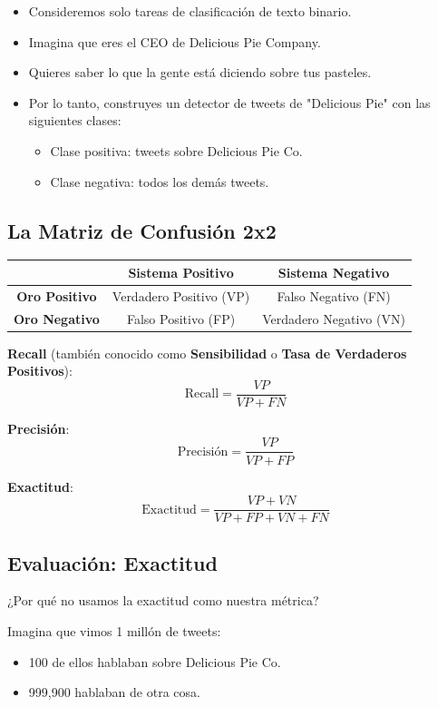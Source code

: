 \documentclass[11pt,fleqn]{book} %
\begin{document}
\begin{itemize}
 \item Consideremos solo tareas de clasificación de texto binario.
 \item Imagina que eres el CEO de Delicious Pie Company.
 \item Quieres saber lo que la gente está diciendo sobre tus pasteles.
 \item Por lo tanto, construyes un detector de tweets de "Delicious Pie" con las siguientes clases:
\begin{itemize}
\item Clase positiva: tweets sobre Delicious Pie Co.
\item Clase negativa: todos los demás tweets.
\end{itemize}
\end{itemize}



\subsection{La Matriz de Confusión 2x2}
\begin{table}[h]
\centering
\begin{tabular}{|c|c|c|}
\hline
\textbf{} & \textbf{Sistema Positivo} & \textbf{Sistema Negativo} \\
\hline
\textbf{Oro Positivo} & Verdadero Positivo (VP) & Falso Negativo (FN) \\
\hline
\textbf{Oro Negativo} & Falso Positivo (FP) & Verdadero Negativo (VN) \\
\hline
\end{tabular}
\end{table}

\textbf{Recall} (también conocido como \textbf{Sensibilidad} o \textbf{Tasa de Verdaderos Positivos}):
\[ \text{Recall} = \frac{VP}{VP + FN} \]

\textbf{Precisión}:
\[ \text{Precisión} = \frac{VP}{VP + FP} \]

\textbf{Exactitud}:
\[ \text{Exactitud} = \frac{VP + VN}{VP + FP + VN + FN} \]


\subsection{Evaluación: Exactitud}
¿Por qué no usamos la exactitud como nuestra métrica?

Imagina que vimos 1 millón de tweets:
\begin{itemize}
\item 100 de ellos hablaban sobre Delicious Pie Co.
\item 999,900 hablaban de otra cosa.
\end{itemize}
\end{document}
